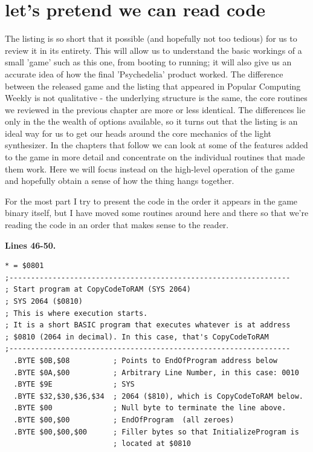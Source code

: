\chapter{let's pretend we can read code} 
\label{sec:commentary}
\rhead[]{\leftmark}
\lstset{style=6502Style}
\lstset{ 
   aboveskip=5pt,
   belowskip=0pt,
}
The listing is so short that it possible (and hopefully not too tedious) for us to
review it in its entirety. This will allow us to understand the basic workings of 
a small 'game' such as this one, from booting to running; it will also give us an
accurate idea of how the final 'Psychedelia' product worked. The difference between
the released game and the listing that appeared in Popular Computing Weekly is not
qualitative - the underlying structure is the same, the core routines we reviewed 
in the previous chapter are more or less identical. The differences lie only in the
the wealth of options available, so it turns out that the listing is an ideal way
for us to get our heads around the core mechanics of the light synthesizer. In the
chapters that follow we can look at some of the features added to the game in more
detail and concentrate on the individual routines that made them work. Here we will
focus instead on the high-level operation of the game and hopefully obtain a sense
of how the thing hangs together.

For the most part I try to present the code in the order it appears in the game
binary itself, but I have moved some routines around here and there so that we're
reading the code in an order that makes sense to the reader.

\clearpage
\textbf{Lines 46-50. }
\begin{lstlisting}[caption=The bootstrap routine common to nearly every C64 program]
* = $0801
;-----------------------------------------------------------------
; Start program at CopyCodeToRAM (SYS 2064)
; SYS 2064 ($0810)
; This is where execution starts.
; It is a short BASIC program that executes whatever is at address
; $0810 (2064 in decimal). In this case, that's CopyCodeToRAM
;-----------------------------------------------------------------
  .BYTE $0B,$08          ; Points to EndOfProgram address below
  .BYTE $0A,$00          ; Arbitrary Line Number, in this case: 0010
  .BYTE $9E              ; SYS
  .BYTE $32,$30,$36,$34  ; 2064 ($810), which is CopyCodeToRAM below.
  .BYTE $00              ; Null byte to terminate the line above.
  .BYTE $00,$00          ; EndOfProgram  (all zeroes)
  .BYTE $00,$00,$00      ; Filler bytes so that InitializeProgram is
                         ; located at $0810
\end{lstlisting}

